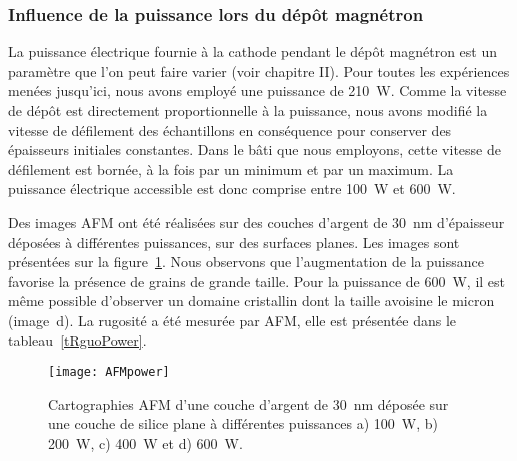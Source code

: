 	\subsubsection{Influence de la puissance lors du dépôt magnétron}
La puissance électrique fournie à la cathode pendant le dépôt magnétron est un paramètre que l'on peut faire varier (voir chapitre II). Pour toutes les expériences menées jusqu'ici, nous avons employé une puissance de 210~W. Comme la vitesse de dépôt est directement proportionnelle à la puissance, nous avons modifié la vitesse de défilement des échantillons en conséquence pour conserver des épaisseurs initiales constantes. Dans le bâti que nous employons, cette vitesse de défilement est bornée, à la fois par un minimum et par un maximum. La puissance électrique accessible est donc comprise entre 100~W et 600~W.\par 
Des images AFM ont été réalisées sur des couches d'argent de 30~nm d'épaisseur déposées à différentes puissances, sur des surfaces planes. Les images sont présentées sur la figure~\ref{AFMpower}. Nous observons que l'augmentation de la puissance favorise la présence de grains de grande taille. Pour la puissance de 600~W, il est même possible d'observer un domaine cristallin dont la taille avoisine le micron (image~d). La rugosité a été mesurée par AFM, elle est présentée dans le tableau~\ref{tRguoPower}.\par 
\begin{figure}[!htb]
\centering
\texttt{[image: AFMpower]}
\caption{Cartographies AFM d'une couche d'argent de 30~nm déposée sur une couche de silice plane à différentes puissances a) 100~W, b) 200~W, c) 400~W et d) 600~W.}
\label{AFMpower}
\end{figure}

